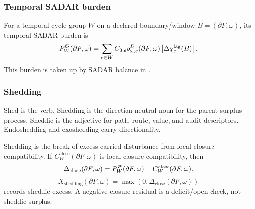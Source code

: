 \subsubsection{Temporal SADAR burden}\label{subsec:temporal-sadar-burden}
For a temporal cycle group \(W\) on a declared boundary/window \(B=(\partial F,\omega)\), its temporal SADAR burden is
\begin{equation}
P^{\mathfrak S}_{W}(\partial F,\omega)=
\sum_{e\in W}
C_{3,e}
\rho^D_{\omega,e}(\partial F,\omega)
\left|\Delta\chi_e^{\mathrm{lag}}(B)\right|.
\label{eq:temporal-sadar-burden}
\end{equation}
This burden is taken up by SADAR balance in .

\subsubsection{Shedding}\label{subsec:shedding}
\begin{definition}[Shedding]
Shed is the verb. Shedding is the direction-neutral noun for the parent surplus process. Sheddic is the adjective for path, route, value, and audit descriptors. Endoshedding and exoshedding carry directionality.

Shedding is the break of excess carried disturbance from local closure compatibility. If \(C^{\mathrm{close}}_W(\partial F,\omega)\) is local closure compatibility, then
\begin{equation}
\Delta_{\mathrm{close}}(\partial F,\omega)
=
P_W^{\mathfrak S}(\partial F,\omega)-C^{\mathrm{close}}_W(\partial F,\omega).
\label{eq:closure-residual}
\end{equation}
\begin{equation}
X_{\mathrm{shedding}}(\partial F,\omega)=
\max\!\left(0,
\Delta_{\mathrm{close}}(\partial F,\omega)
\right)
\label{eq:shedding-excess}
\end{equation}
records sheddic excess. A negative closure residual is a deficit/open check, not sheddic surplus.
\end{definition}

